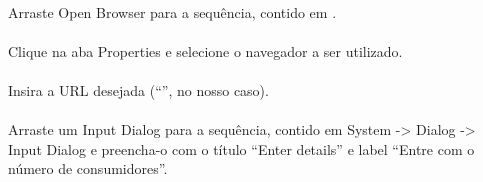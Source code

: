 \documentclass[letterpaper,10pt,brazil]{sphinxmanual}
\begin{document}
\paragraph{}
\label{\detokenize{exercise_2:iv-insira-open-browser-na-sequencia}}
Arraste Open Browser para a sequência, contido em .

\begin{figure}[htbp]
\centering

\noindent{}
\end{figure}


\paragraph{}
\label{\detokenize{exercise_2:v-selecionar-navegador}}
Clique na aba Properties e selecione o navegador a ser utilizado.

\begin{figure}[htbp]
\centering

\noindent{}
\end{figure}


\paragraph{}
\label{\detokenize{exercise_2:vi-inserir-url}}
Insira a URL desejada (“”, no nosso caso).

\begin{figure}[htbp]
\centering

\noindent{}
\end{figure}


\paragraph{}
\label{\detokenize{exercise_2:vii-inserir-input-dialog-na-sequencia}}
Arraste um Input Dialog para a sequência, contido em System -\textgreater{} Dialog -\textgreater{} Input Dialog e preencha-o com o título “Enter details” e label “Entre com o número de consumidores”.
\end{document}
